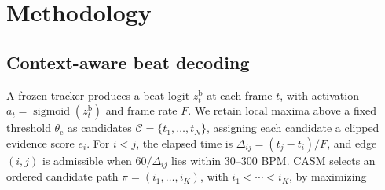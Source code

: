 \documentclass{article}
\begin{document}




\section{Methodology}
\label{sec:method}




\subsection{Context-aware beat decoding}
A frozen tracker produces a beat logit $z_t^{\mathrm b}$ at each
frame $t$, with activation $a_t=\operatorname{sigmoid}(z_t^{\mathrm b})$ and frame rate $F$. We retain local maxima above a fixed threshold $\theta_{\mathrm c}$ as candidates $\mathcal C=\{t_1,\ldots,t_N\}$, assigning each candidate a clipped evidence score $e_i$. For $i<j$, the elapsed time is
$\Delta_{ij}=(t_j-t_i)/F$, and edge $(i,j)$ is admissible when
$60/\Delta_{ij}$ lies within 30--300 BPM. CASM selects an ordered candidate path
$\pi=(i_1,\ldots,i_K)$, with $i_1<\cdots<i_K$, by maximizing
\end{document}
